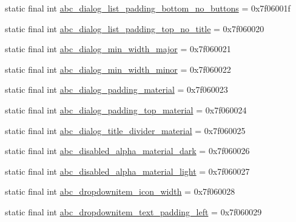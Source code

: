 \begin{DoxyCompactItemize}
\item 
static final int \mbox{\hyperlink{classandroid_1_1support_1_1design_1_1R_1_1dimen_ab52071bc335c5633a66a272e80e8a808}{abc\+\_\+dialog\+\_\+list\+\_\+padding\+\_\+bottom\+\_\+no\+\_\+buttons}} = 0x7f06001f
\item 
static final int \mbox{\hyperlink{classandroid_1_1support_1_1design_1_1R_1_1dimen_a9491c77705010b3d0ce622a6473423a8}{abc\+\_\+dialog\+\_\+list\+\_\+padding\+\_\+top\+\_\+no\+\_\+title}} = 0x7f060020
\item 
static final int \mbox{\hyperlink{classandroid_1_1support_1_1design_1_1R_1_1dimen_a15f18eb1f09e97f0916635c3b780e3d4}{abc\+\_\+dialog\+\_\+min\+\_\+width\+\_\+major}} = 0x7f060021
\item 
static final int \mbox{\hyperlink{classandroid_1_1support_1_1design_1_1R_1_1dimen_a6a73848d8d821f2d6fcf111851f69708}{abc\+\_\+dialog\+\_\+min\+\_\+width\+\_\+minor}} = 0x7f060022
\item 
static final int \mbox{\hyperlink{classandroid_1_1support_1_1design_1_1R_1_1dimen_a520740e21ad1d52830d8977ff10afd5e}{abc\+\_\+dialog\+\_\+padding\+\_\+material}} = 0x7f060023
\item 
static final int \mbox{\hyperlink{classandroid_1_1support_1_1design_1_1R_1_1dimen_affd502ad3ee057bb26d6ce1cd4cc89b6}{abc\+\_\+dialog\+\_\+padding\+\_\+top\+\_\+material}} = 0x7f060024
\item 
static final int \mbox{\hyperlink{classandroid_1_1support_1_1design_1_1R_1_1dimen_aae14fca8db24b62c071e215399ad571c}{abc\+\_\+dialog\+\_\+title\+\_\+divider\+\_\+material}} = 0x7f060025
\item 
static final int \mbox{\hyperlink{classandroid_1_1support_1_1design_1_1R_1_1dimen_a711065db6123eeca1bdda1feae6ee604}{abc\+\_\+disabled\+\_\+alpha\+\_\+material\+\_\+dark}} = 0x7f060026
\item 
static final int \mbox{\hyperlink{classandroid_1_1support_1_1design_1_1R_1_1dimen_ad1756a425760ec484cfb76295400d4db}{abc\+\_\+disabled\+\_\+alpha\+\_\+material\+\_\+light}} = 0x7f060027
\item 
static final int \mbox{\hyperlink{classandroid_1_1support_1_1design_1_1R_1_1dimen_acc8d9f0a4c9277aa49a4c1cc8090c70e}{abc\+\_\+dropdownitem\+\_\+icon\+\_\+width}} = 0x7f060028
\item 
static final int \mbox{\hyperlink{classandroid_1_1support_1_1design_1_1R_1_1dimen_a968fc63b6429432c490e18cf8e1ae698}{abc\+\_\+dropdownitem\+\_\+text\+\_\+padding\+\_\+left}} = 0x7f060029
\item 

\end{DoxyCompactItemize}
